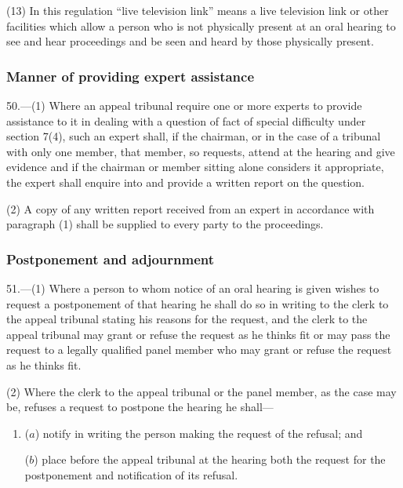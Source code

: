 \documentclass[12pt,a4paper]{article}
\begin{document}
(13) In this regulation “live television link” means a live television link or other facilities which allow a person who is not physically present at an oral hearing to see and hear proceedings and be seen and heard by those physically present.


\subsubsection[50. Manner of providing expert assistance]{Manner of providing expert assistance}

50.—(1) Where an appeal tribunal require one or more experts to provide assistance to it in dealing with a question of fact of special difficulty under section 7(4), such an expert shall, if the chairman, or in the case of a tribunal with only one member, that member, so requests, attend at the hearing and give evidence and if the chairman or member sitting alone considers it appropriate, the expert shall enquire into and provide a written report on the question.

(2) A copy of any written report received from an expert in accordance with paragraph (1) shall be supplied to every party to the proceedings.

\subsubsection[51. Postponement and adjournment]{Postponement and adjournment}

51.—(1) Where a person to whom notice of an oral hearing is given wishes to request a postponement of that hearing he shall do so in writing to the clerk to the appeal tribunal stating his reasons for the request, and the clerk to the appeal tribunal may grant or refuse the request as he thinks fit or may pass the request to a legally qualified panel member who may grant or refuse the request as he thinks fit.

(2) Where the clerk to the appeal tribunal or the panel member, as the case may be, refuses a request to postpone the hearing he shall—
\begin{enumerate}\item[]
($a$) notify in writing the person making the request of the refusal; and

($b$) place before the appeal tribunal at the hearing both the request for the postponement and notification of its refusal.
\end{enumerate}
\end{document}
